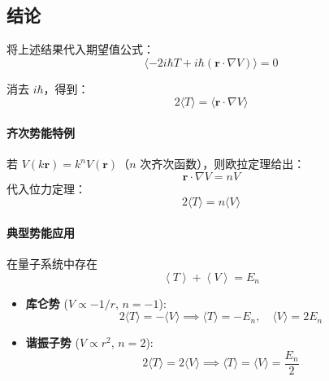 \subsection*{结论}
将上述结果代入期望值公式：
\begin{equation}
	\langle -2i\hbar T + i\hbar (\mathbf{r} \cdot \nabla V) \rangle = 0
\end{equation}

消去 $i\hbar$，得到：
\begin{equation}\boxed{
		2\langle T \rangle = \langle \mathbf{r} \cdot \nabla V \rangle
	}
\end{equation}
\paragraph{齐次势能特例}
若 $V(k \mathbf{r}) = k^n V(\mathbf{r})$（$n$ 次齐次函数），则欧拉定理给出：
\[
\mathbf{r} \cdot \nabla V = n V
\]
代入位力定理：
\begin{equation}
	\boxed{2\langle T \rangle = n \langle V \rangle}
\end{equation}

\paragraph{典型势能应用}
在量子系统中存在
\[\left\langle T \right\rangle  + \left\langle V \right\rangle  = {E_n}\]
\begin{itemize}
	\item \textbf{库仑势} ($V \propto -1/r$, $n = -1$):
	\[
	2\langle T \rangle = -\langle V \rangle \implies \langle T \rangle = -E_n, \quad \langle V \rangle = 2E_n
	\]
	
	\item \textbf{谐振子势} ($V \propto r^2$, $n = 2$):
	\[
	2\langle T \rangle = 2\langle V \rangle \implies \langle T \rangle = \langle V \rangle = \frac{E_n}{2}
	\]
\end{itemize}
